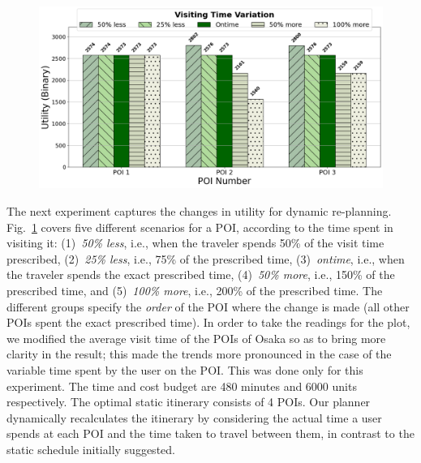 \begin{figure}[t]
    \centering
    \includegraphics[width=\figwidth]{plots/dynamic_pkj.png}
    \label{fig:dynamic}
\end{figure}

The next experiment captures the changes in utility for dynamic re-planning.
Fig.~\ref{fig:dynamic} covers five different scenarios for a POI, according to the time spent in visiting it: (1)~\emph{50\% less}, i.e., when the traveler spends 50\% of the visit time prescribed, (2)~\emph{25\% less}, i.e., 75\% of the prescribed time, (3)~\emph{ontime}, i.e., when the traveler spends the exact prescribed time, (4)~\emph{50\% more}, i.e., 150\% of the prescribed time, and (5)~\emph{100\% more}, i.e., 200\% of the prescribed time.
The different groups specify the \emph{order} of the POI where the change is made (all other POIs spent the exact prescribed time).
In order to take the readings for the plot, we modified the average visit time of the POIs of Osaka so as to bring more clarity in the result; this made the trends more pronounced in the case of the variable time spent by the user on the POI.
This was done only for this experiment.
The time and cost budget are 480 minutes and 6000 units respectively.
The optimal static itinerary consists of 4 POIs.
Our planner dynamically recalculates the itinerary by considering the actual time a user spends at each POI and the time taken to travel between them, in contrast to the static schedule initially suggested.

